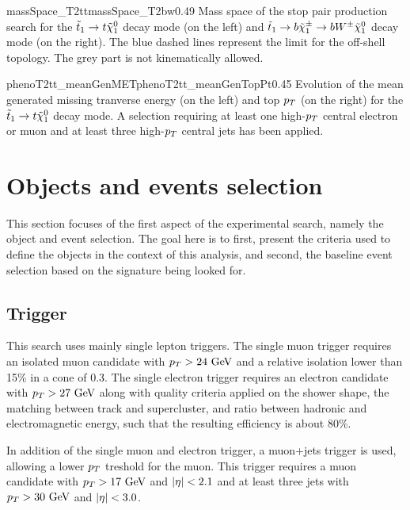                      {massSpace_T2tt}{massSpace_T2bw}{0.49}
                     {Mass space of the stop pair production search for the $\tilde{t}_1 \rightarrow t \tilde{\chi}_1^0$
                     decay mode (on the left) and $\tilde{t}_1 \rightarrow b \tilde{\chi}_1^\pm \rightarrow b W^{\pm} \tilde{\chi}_1^0 $
                     decay mode (on the right). The blue dashed lines represent the limit for the off-shell topology.
                     The grey part is not kinematically allowed.}
 
                     {phenoT2tt_meanGenMET}{phenoT2tt_meanGenTopPt}{0.45}
                     {Evolution of the mean generated missing tranverse energy (on the left) and top $p_T$
                     (on the right) for the $\tilde{t}_1 \rightarrow t \tilde{\chi}_1^0$ decay mode. A selection requiring
                     at least one high-$p_T$ central electron or muon and at least three high-$p_T$ central jets
                     has been applied.}

    \section{Objects and events selection \label{sec:analysis_objectAndEventSelection}}

    This section focuses of the first aspect of the experimental search, namely the object and event selection. 
    The goal here is to first, present the criteria used to define the objects in the context of this analysis,
    and second, the baseline event selection based on the signature being looked for.

        \subsection{Trigger}

    
    This search uses mainly single lepton triggers. The single muon trigger requires an isolated muon candidate
    with $p_T > 24 ~\text{GeV}$ and a relative isolation lower than 15\% in a cone of 0.3. The single electron trigger
    requires an electron candidate with $p_T > 27 ~\text{GeV}$ along with quality criteria applied on the shower shape,
    the matching between track and supercluster, and ratio between hadronic and electromagnetic energy, such that
    the resulting efficiency is about 80\%.

    In addition of the single muon and electron trigger, a muon+jets trigger is used, allowing a lower $p_T$ treshold
    for the muon. This trigger requires a muon candidate with $p_T > 17 ~\text{GeV}$ and $\left| \eta \right| < 2.1$ and at least three 
    jets with $p_T > 30 ~\text{GeV}$ and $\left| \eta \right| < 3.0$.

